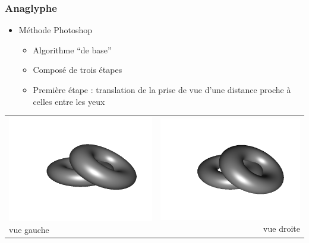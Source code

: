 \documentclass{beamer}
\begin{document}
%

\begin{frame}
\frametitle{Anaglyphe}
\begin{itemize}[label=$\bullet$]
\item Méthode Photoshop \cite{stereoAnaglyph}
	\begin{itemize}[label=$\circ$]
	\item Algorithme ``de base''
	\item Composé de trois étapes 
	\item Première étape : translation de la prise de vue d'une distance proche à celles entre les yeux 
	\end{itemize}
\end{itemize}
\begin{tabular}{l|r}
\includegraphics[scale=0.15]{flip1.png}
vue gauche
&
\includegraphics[scale=0.15]{flip2.png}
vue droite
\end{tabular}

\end{frame}
\end{document}
